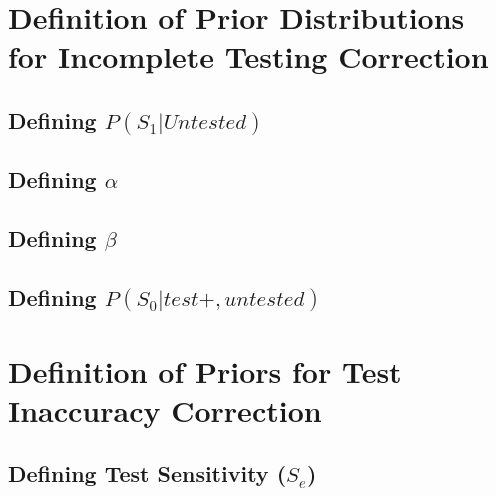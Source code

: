 \documentclass[12pt,twoside]{smiththesis}
\begin{document}
\hypertarget{definition-of-prior-distributions-for-incomplete-testing-correction}{%
\section{Definition of Prior Distributions for Incomplete Testing Correction}\label{definition-of-prior-distributions-for-incomplete-testing-correction}}

\hypertarget{defining-ps_1untested}{%
\subsection{\texorpdfstring{Defining \(P(S_1|Untested)\)}{Defining P(S\_1\textbar Untested)}}\label{defining-ps_1untested}}

\hypertarget{defining-alpha}{%
\subsection{\texorpdfstring{Defining \(\alpha\)}{Defining \textbackslash alpha}}\label{defining-alpha}}

\hypertarget{defining-beta}{%
\subsection{\texorpdfstring{Defining \(\beta\)}{Defining \textbackslash beta}}\label{defining-beta}}

\hypertarget{defining-ps_0testuntested}{%
\subsection{\texorpdfstring{Defining \(P(S_0|test+,untested)\)}{Defining P(S\_0\textbar test+,untested)}}\label{defining-ps_0testuntested}}

\hypertarget{definition-of-priors-for-test-inaccuracy-correction}{%
\section{Definition of Priors for Test Inaccuracy Correction}\label{definition-of-priors-for-test-inaccuracy-correction}}

\hypertarget{defining-test-sensitivity-s_e}{%
\subsection{\texorpdfstring{Defining Test Sensitivity (\(S_e\))}{Defining Test Sensitivity (S\_e)}}\label{defining-test-sensitivity-s_e}}
\end{document}
